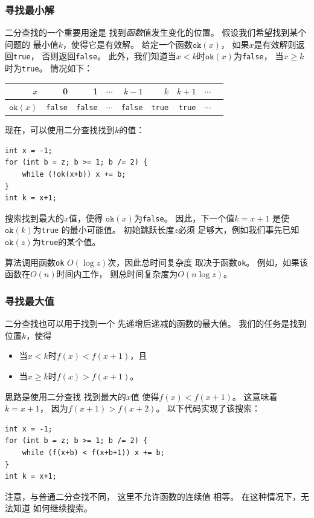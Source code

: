 \subsubsection{寻找最小解}

二分查找的一个重要用途是
找到\emph{函数}值发生变化的位置。
假设我们希望找到某个问题的
最小值$k$，使得它是有效解。
给定一个函数$\texttt{ok}(x)$，
如果$x$是有效解则返回\texttt{true}，
否则返回\texttt{false}。
此外，我们知道当$x<k$时$\texttt{ok}(x)$为\texttt{false}，
当$x \ge k$时为\texttt{true}。
情况如下：

\begin{center}
\begin{tabular}{r|rrrrrrrr}
$x$ & 0 & 1 & $\cdots$ & $k-1$ & $k$ & $k+1$ & $\cdots$ \\
\hline
$\texttt{ok}(x)$ & \texttt{false} & \texttt{false}
& $\cdots$ & \texttt{false} & \texttt{true} & \texttt{true} & $\cdots$ \\
\end{tabular}
\end{center}

\noindent
现在，可以使用二分查找找到$k$的值：

\begin{lstlisting}
int x = -1;
for (int b = z; b >= 1; b /= 2) {
    while (!ok(x+b)) x += b;
}
int k = x+1;
\end{lstlisting}

搜索找到最大的$x$值，使得
$\texttt{ok}(x)$为\texttt{false}。
因此，下一个值$k=x+1$
是使$\texttt{ok}(k)$为\texttt{true}
的最小可能值。
初始跳跃长度$z$必须
足够大，例如我们事先已知
$\texttt{ok}(z)$为\texttt{true}的某个值。

算法调用函数\texttt{ok}
$O(\log z)$次，因此总时间复杂度
取决于函数\texttt{ok}。
例如，如果该函数在$O(n)$时间内工作，
则总时间复杂度为$O(n \log z)$。

\subsubsection{寻找最大值}

二分查找也可以用于找到一个
先递增后递减的函数的最大值。
我们的任务是找到位置$k$，使得

\begin{itemize}
\item
当$x<k$时$f(x)<f(x+1)$，且
\item
当$x \ge k$时$f(x)>f(x+1)$。
\end{itemize}

思路是使用二分查找
找到最大的$x$值
使得$f(x)<f(x+1)$。
这意味着$k=x+1$，
因为$f(x+1)>f(x+2)$。
以下代码实现了该搜索： 

\begin{lstlisting}
int x = -1;
for (int b = z; b >= 1; b /= 2) {
    while (f(x+b) < f(x+b+1)) x += b;
}
int k = x+1;
\end{lstlisting}

注意，与普通二分查找不同，
这里不允许函数的连续值
相等。
在这种情况下，无法知道
如何继续搜索。
